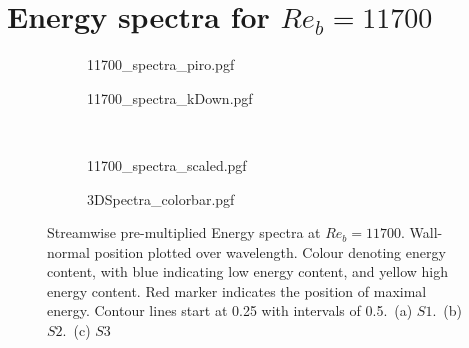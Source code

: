 \section{Energy spectra for $Re_b = 11700$}
\begin{figure}[h!]
    \centering
    \begin{subfigure}{0.495\textwidth}
        \subcaption{}
        {11700_spectra_piro.pgf}
        \label{subfig: 11700 spectra piro}
    \end{subfigure}
    \hfill
        \begin{subfigure}{0.495\textwidth}
            \subcaption{}
            {11700_spectra_kDown.pgf}
            \label{subfig: 11700 spectra kDown}
    \end{subfigure}
    \\[-20pt]
    \begin{subfigure}{0.495\textwidth}
        \subcaption{}
        {11700_spectra_scaled.pgf}
        \label{subfig: 11700 spectra scaled}
    \end{subfigure}
    \centering
    \begin{subfigure}{\textwidth}
        \centering
        \hspace{0.9cm}
        {3DSpectra_colorbar.pgf}
    \end{subfigure}
    \caption[Streamwise pre-multiplied energy spectra at $Re_b = 11700$]{Streamwise pre-multiplied Energy spectra at $Re_b = 11700$. Wall-normal position plotted over wavelength. Colour denoting energy content, with blue indicating low energy content, and yellow high energy content. Red marker indicates the position of maximal energy. Contour lines start at 0.25 with intervals of 0.5.~(a) $S1$.~(b) $S2$.~(c) $S3$}
    \label{fig: energy spectra 11700}
\end{figure}

